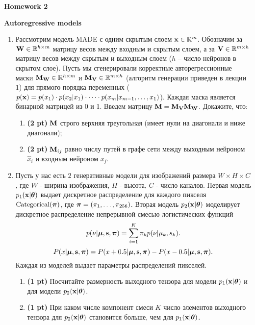 \documentclass{article}
\begin{document}
\begin{center}
    {\Large \textbf{Homework 2}} \\
\end{center}

{\large \textbf{Autoregressive models}}
\begin{enumerate}
    \item Рассмотрим модель MADE с одним скрытым слоем $\mathbf{x} \in \mathbb{R}^m$. Обозначим за $\mathbf{W} \in \mathbb{R}^{h \times m}$ матрицу весов между входным и скрытым слоем, а за $\mathbf{V} \in \mathbb{R}^{m \times h}$ матрицу весов между скрытым и выходным слоем ($h$ -- число нейронов в скрытом слое). Пусть мы сгенерировали корректные авторегрессионные маски $\mathbf{M}_{\mathbf{W}} \in \mathbb{R}^{h \times m}$ и $\mathbf{M}_{\mathbf{V}} \in \mathbb{R}^{m \times h}$ (алгоритм генерации приведен в лекции 1) для прямого порядка переменных ($p(\mathbf{x}) = p(x_1) \cdot p(x_2 | x_1) \cdot \dots \cdot p(x_m | x_{m-1}, \dots, x_1)$). Каждая маска является бинарной матрицей из 0 и 1. Введем матрицу $\mathbf{M} = \mathbf{M}_{\mathbf{V}} \mathbf{M}_{\mathbf{W}}$. Докажите, что:
    \begin{enumerate}
    	\item  \textbf{(2 pt)} $\mathbf{M}$ строго верхняя треугольная (имеет нули на диагонали и ниже диагонали);
    	\item  \textbf{(2 pt)} $\mathbf{M}_{ij}$ равно числу путей в графе сети между выходным нейроном $\hat{x}_i$ и входным нейроном $x_j$.
    \end{enumerate}
    \item Пусть у нас есть 2 генеративные модели для изображений размера $W \times H \times C$, где $W$ - ширина изображения, $H$ - высота, $C$ - число каналов. Первая модель $p_1(\mathbf{x} | \boldsymbol{\theta})$ выдает дискретное распределение для каждого пикселя $\text{Categorical}(\boldsymbol{\pi})$, где $\boldsymbol{\pi} = (\pi_1, \dots,  \pi_{256})$. Вторая модель $p_2(\mathbf{x} | \boldsymbol{\theta})$ моделирует дискретное распределение непрерывной смесью логистических функций
   		\[
  				p(\nu | \boldsymbol{\mu}, \mathbf{s}, \boldsymbol{\pi}) = \sum_{i=1}^K \pi_k p(\nu | \mu_k, s_k).
		\]
    	\[
    		P(x | \boldsymbol{\mu}, \mathbf{s}, \boldsymbol{\pi}) = P(x + 0.5 | \boldsymbol{\mu}, \mathbf{s}, \boldsymbol{\pi}) - P(x - 0.5 | \boldsymbol{\mu}, \mathbf{s}, \boldsymbol{\pi}).
    	\]
    Каждая из моделей выдает параметры распределений пикселей.
    	\begin{enumerate}
    		\item \textbf{(1 pt)} Посчитайте размерность выходного тензора для модели $p_1(\mathbf{x} | \boldsymbol{\theta})$ и для модели $p_2(\mathbf{x} | \boldsymbol{\theta})$. 
    		\item \textbf{(1 pt)} При каком числе компонент смеси $K$ число элементов выходного тензора для $p_2(\mathbf{x} | \boldsymbol{\theta})$ становится больше, чем для $p_1(\mathbf{x} | \boldsymbol{\theta})$.
    	\end{enumerate}
\end{enumerate}
\end{document}
